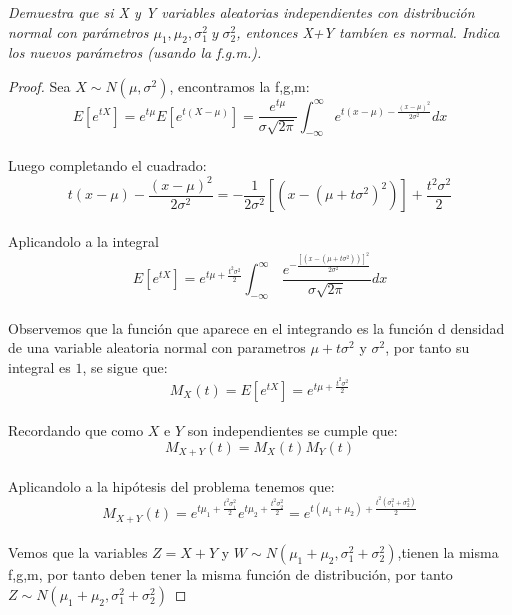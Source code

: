 \documentclass[11pt]{article}
\begin{document}
\begin{tcolorbox}[title = \textcolor{black}{\textcolor{white}{Problema 6}}]
\textit{
 Demuestra que si X y Y variables aleatorias independientes con distribuci\'on
  normal con par\'ametros $\mu_1, \mu_2, \sigma_1^2 \;y\;\sigma_2^2 $,
  entonces X+Y tamb\'ien es normal. Indica los nuevos par\'ametros  (usando la f.g.m.).
}
\end{tcolorbox}
\begin{proof}
    Sea $X\sim N(\mu,\sigma^2)$, encontramos la f,g,m:\,\\
    \begin{equation*}
        E[e^{tX}]=e^{t\mu}E[e^{t(X-\mu)}]=\frac{e^{t\mu}}{\sigma \sqrt{2\pi}}\int_{-\infty}^{\infty} e^{t(x-\mu)-\frac{(x-\mu)^2}{2\sigma^2}}dx
    \end{equation*}\,\\
    Luego completando el cuadrado:\,\\
    \begin{equation*}
        t(x-\mu)-\frac{(x-\mu)^2}{2\sigma^2}=-\frac{1}{2\sigma^2}[(x-(\mu+t\sigma^2)^2)]+\frac{t^2\sigma^2}{2}
    \end{equation*}\,\\
    Aplicandolo a la integral
    \begin{equation*}
        E[e^{tX}]=e^{t\mu+\frac{t^2\sigma^2}{2}} \int_{-\infty}^{\infty}\,\frac{e^{-\frac{[(x-(\mu+t\sigma^2))]^2}{2\sigma^2}}}{\sigma \sqrt{2\pi}}dx
    \end{equation*}\,\\
    Observemos que la funci\'on que aparece en el integrando es la funci\'on d densidad de una variable aleatoria normal con parametros $\mu+t\sigma^2$ y $\sigma^2$, por tanto su integral es $1$, se sigue que:\,\\
    \begin{equation*}
        M_{X}(t)=E[e^{tX}]=e^{t\mu+\frac{t^2\sigma^2}{2}}
    \end{equation*}\,\\
    Recordando que como $X$ e $Y$ son independientes se cumple que:\,\\
    \begin{equation*}
        M_{X+Y}(t)=M_{X}(t)M_Y(t)
    \end{equation*}\,\\
    Aplicandolo a la hip\'otesis del problema tenemos que:\,\\
    \begin{equation*}
        M_{X+Y}(t)=e^{t\mu_1+\frac{t^2\sigma_1^2}{2}}e^{t\mu_2+\frac{t^2\sigma_2^2}{2}}=e^{t(\mu_1+\mu_2)+\frac{t^2(\sigma_1^2+\sigma_2^2)}{2}}
    \end{equation*}\,\\
    Vemos que la variables $Z=X+Y$ y $W\sim N(\mu_1+\mu_2,\sigma_1^2+\sigma_2^2)$,tienen la misma f,g,m, por tanto deben tener la misma funci\'on de distribuci\'on, por tanto $Z\sim N(\mu_1+\mu_2,\sigma_1^2+\sigma_2^2)$
\end{proof}\,\\
\end{document}
